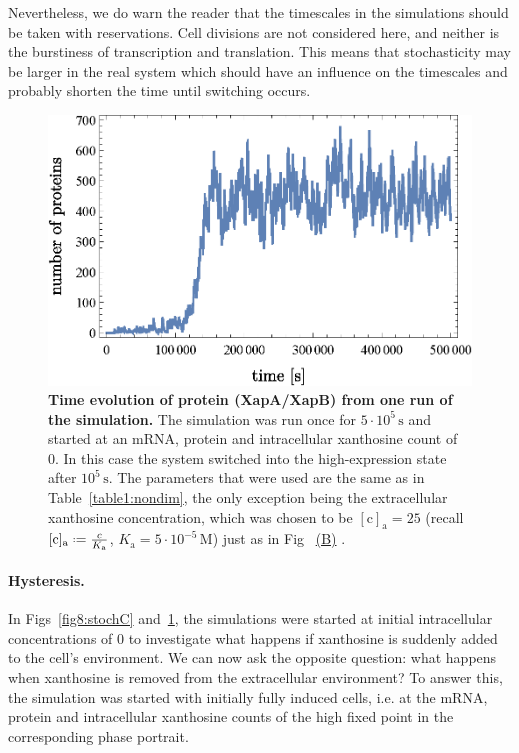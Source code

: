 \documentclass[10pt,letterpaper]{article}
\newcommand{\unit}[1]{\,\mathrm{#1}}
\newcommand{\n}[1]{\mathrm{#1}}
\newcommand*{\defeq}{\mathrel{\vcenter{\baselineskip0.5ex \lineskiplimit0pt
			\hbox{\scriptsize.}\hbox{\scriptsize.}}}%
	=}
\newcommand\subref[2]{%
	\def\myref{\getrefnumber{#1}}%
	\hyperref[#1]{\myref\mbox{#2}}%
}
\begin{document}
	Nevertheless, we do warn the reader that the timescales in the simulations
	should be taken with reservations. Cell divisions are not considered here,
	and neither is the burstiness of transcription and translation. This means
	that stochasticity may be larger in the real system which should have an
	influence on the timescales and probably shorten the time until switching
	occurs.
	
	\begin{figure}%
		\centering
		\includegraphics{media/TimeEvolution.eps}
		\caption{{\bf Time evolution of protein (XapA/XapB) from one run of the simulation.}
			The simulation was run once for $5 \cdot 10^5 \unit{s}$ and started
			at an mRNA, protein and intracellular xanthosine count of 0. In this
			case the system switched into the high-expression state after $10^5
			\unit{s}$. The parameters that were used are the same as in
			Table~\ref{table1:nondim}, the only exception being the
			extracellular xanthosine concentration, which was chosen to be
			$\n{[c]_a} = 25$ (recall $\n{[c]_{a}} \defeq \frac{c}{K_{\n{a}}}$,
			$K_{\n{a}} = 5 \cdot 10^{-5} \unit{M}$) just as in
			Fig~\subref{fig8:stochC}{(B)}.}
		\label{fig:StochT}
	\end{figure}
	
	\paragraph*{Hysteresis.} 
	In Figs~\ref{fig8:stochC} and~\ref{fig:StochT}, the simulations were started at initial
	intracellular concentrations of 0 to investigate what happens if xanthosine
	is suddenly added to the cell's environment. We can now ask the opposite
	question: what happens when xanthosine is removed from the extracellular
	environment? To answer this, the simulation was started with initially fully
	induced cells, i.e. at the mRNA, protein and intracellular xanthosine counts
	of the high fixed point in the corresponding phase portrait. 
	
\end{document}
